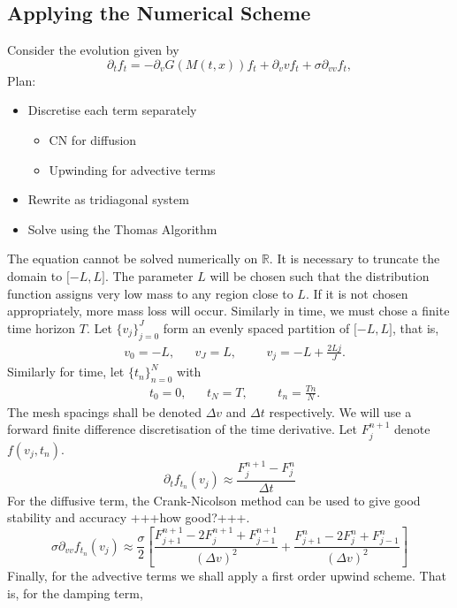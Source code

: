 \documentclass[11pt, a4pape draft]{article}
\renewcommand{\R}{\mathbb{R}}
\begin{document}
		\subsection{Applying the Numerical Scheme}
			Consider the evolution given by
			\begin{equation}\label{eq:ZZZZZSpaceHomPDE}
				\partial_t f_t =  - \partial_v G(M(t,x))f_t + \partial_v v f_t + \sigma \partial_{vv}f_t,
			\end{equation}
			Plan:
			\begin{itemize}
				\item Discretise each term separately
					\begin{itemize}
						\item CN for diffusion
						\item Upwinding for advective terms
					\end{itemize}
				\item Rewrite as tridiagonal system
				\item Solve using the Thomas Algorithm
			\end{itemize}
			The equation cannot be solved numerically on $\R$. It is necessary to truncate the domain to $\lbrack-L,L\rbrack$. The parameter $L$ will be chosen such that the distribution function assigns very low mass to any region close to $L$. If it is not chosen appropriately, more mass loss will occur. Similarly in time, we must chose a finite time horizon $T$. Let $\lbrace v_j \rbrace_{j=0}^J$ form an evenly spaced partition of $\lbrack-L,L\rbrack$, that is,
			\begin{align*}
				&v_0 = -L, &&v_J = L, &&&v_j = -L + \frac{2Lj}{J}.
			\end{align*}
			Similarly for time, let $\lbrace t_n\rbrace_{n=0}^N$ with
			\begin{align*}
			&t_0 = 0, &&t_N = T , &&&t_n = \frac{Tn}{N}.
			\end{align*}
			The mesh spacings shall be denoted $\Delta v$ and $\Delta t$ respectively. We will use a forward finite difference discretisation of the time derivative. Let $F^{n+1}_j$ denote $f(v_j,t_n)$.
			\[
				\partial_t f_{t_n}(v_j) \approx \frac{F_j^{n+1} - F_j^n}{\Delta t}
			\]
			For the diffusive term, the Crank-Nicolson method can be used to give good stability and accuracy +++how good?+++.
			\[
				\sigma \partial_{vv} f_{t_n}(v_j) \approx \frac{\sigma}{2}\left[ \frac{F^{n+1}_{j+1} - 2F^{n+1}_j + F^{n+1}_{j-1}}{(\Delta v)^2} + \frac{F^{n}_{j+1} - 2F^{n}_j + F^{n}_{j-1}}{(\Delta v)^2}\right] 
			\]
			Finally, for the advective terms we shall apply a first order upwind scheme. That is, for the damping term,
\end{document}
